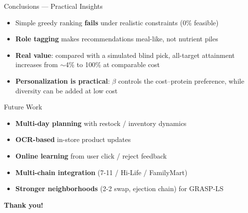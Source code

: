 \documentclass[10pt,aspectratio=169]{beamer}
\begin{document}
\begin{frame}{Conclusions --- Practical Insights}
\begin{itemize}
  \item Simple greedy ranking \textbf{fails} under realistic constraints (\alert{0\% feasible})
  \item \textbf{Role tagging} makes recommendations meal-like, not nutrient piles
  \item \textbf{Real value}: compared with a simulated blind pick, all-target attainment increases from $\sim$4\% to 100\% at comparable cost
  \item \textbf{Personalization is practical}: $\beta$ controls the cost--protein preference, while diversity can be added at low cost
\end{itemize}
\end{frame}

\begin{frame}{Future Work}
\begin{itemize}
  \item \textbf{Multi-day planning} with restock / inventory dynamics
  \item \textbf{OCR-based} in-store product updates
  \item \textbf{Online learning} from user click / reject feedback
  \item \textbf{Multi-chain integration} (7-11 / Hi-Life / FamilyMart)
  \item \textbf{Stronger neighborhoods} (2-2 swap, ejection chain) for GRASP-LS
\end{itemize}
\bigskip
\centering\Large
\textbf{Thank you!}
\end{frame}
\end{document}
